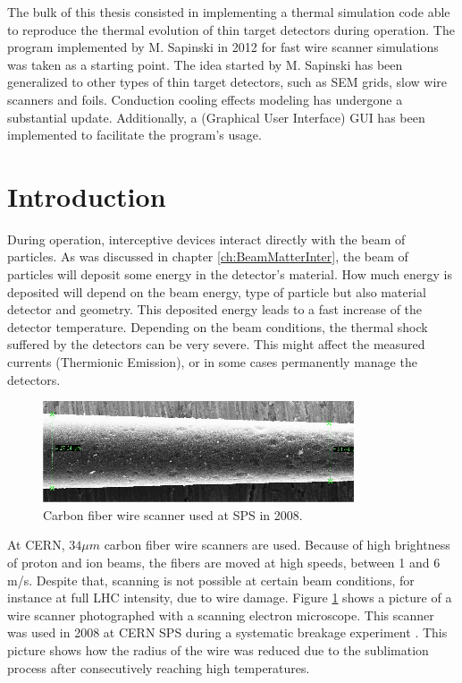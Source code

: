 \pagestyle{fancy}

\graphicspath{ {Figures/Chapter4_ThermalModel/} }

The bulk of this thesis consisted in implementing a thermal simulation code able to reproduce the thermal evolution of thin target detectors during operation.
The program implemented by M. Sapinski in 2012 for fast wire scanner simulations \parencite[][]{ref:Msapinski} was taken as a starting point. The idea started by M. Sapinski has been generalized to other types of thin target detectors, such as SEM grids, slow wire scanners and foils. Conduction cooling effects modeling has undergone a substantial update. Additionally, a (Graphical User Interface) GUI  has been implemented to facilitate the program's usage. 


\section{Introduction}

During operation, interceptive devices interact directly with the beam of particles. As was discussed in chapter \ref{ch:BeamMatterInter}, the beam of particles will deposit some energy in the detector's material. How much energy is deposited will depend on the beam energy, type of particle but also material detector and geometry. This deposited energy leads to a fast increase of the detector temperature. Depending on the beam conditions, the thermal shock suffered by the detectors can be very severe. This might affect the measured currents (Thermionic Emission), or in some cases permanently manage the detectors. 

\begin{figure}[h]
    \centering
    \includegraphics[width=0.60\columnwidth]{WireRadiusDeterioration/WireDamage.png}
    \caption{Carbon fiber wire scanner used at SPS in 2008.}
    \label{fig:WireRadius}
\end{figure}

At CERN, $34 \mu m$ carbon fiber wire scanners are used. Because of high brightness of proton and ion beams, the fibers are moved at high
speeds, between 1 and 6 m/s. Despite that, scanning is not possible at certain beam conditions, for instance at full LHC intensity, due to wire damage. Figure \ref{fig:WireRadius} shows a picture of a wire scanner photographed with a scanning electron microscope. This scanner was used in 2008 at CERN SPS during a systematic breakage experiment \parencite[][]{ref:Msapinski}. This picture shows how the radius of the wire was reduced due to the sublimation process after consecutively reaching high temperatures.

